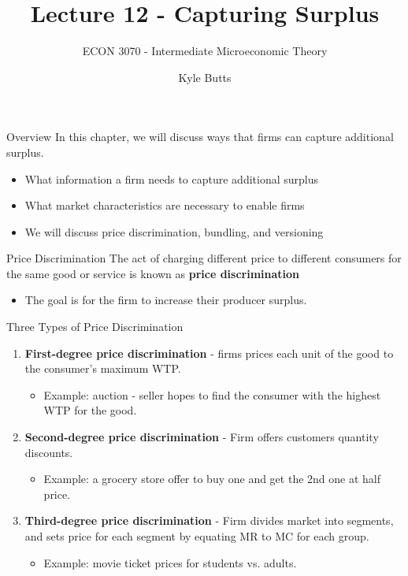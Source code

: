 \documentclass[11pt,t]{beamer}
\author{Kyle Butts}
\title{Lecture 12 - Capturing Surplus}
\subtitle{ECON 3070 - Intermediate Microeconomic Theory}
\begin{document}
\begin{frame}
  \titlepage
\end{frame}

\begin{frame}{Overview}
  In this chapter, we will discuss ways that firms can capture additional surplus.

  \begin{itemize}
    \item What information a firm needs to capture additional surplus
    \item What market characteristics are necessary to enable firms
    \item We will discuss price discrimination, bundling, and versioning
  \end{itemize}
\end{frame}

\begin{frame}{Price Discrimination}
  The act of charging different price to different consumers for the same good or service is known as \textbf{price discrimination}

  \begin{itemize}
    \item The goal is for the firm to increase their producer surplus.
  \end{itemize}
\end{frame}

\begin{frame}{Three Types of Price Discrimination}
  \begin{enumerate}
    \item \textbf{First-degree price discrimination} - firms prices each unit of the good to the consumer's maximum WTP.
    \begin{itemize}
      \item Example: auction - seller hopes to find the consumer with the highest WTP for the good.
    \end{itemize}
    
    \item \textbf{Second-degree price discrimination} - Firm offers customers quantity discounts.
    
    \begin{itemize}
      \item Example: a grocery store offer to buy one and get the 2nd one at half price.
    \end{itemize}
    
    \item \textbf{Third-degree price discrimination} - Firm divides market into segments, and sets price for each segment by equating MR to MC for each group.
    
    \begin{itemize}
      \item Example: movie ticket prices for students vs. adults.
    \end{itemize}
  \end{enumerate}
\end{frame}
\end{document}
